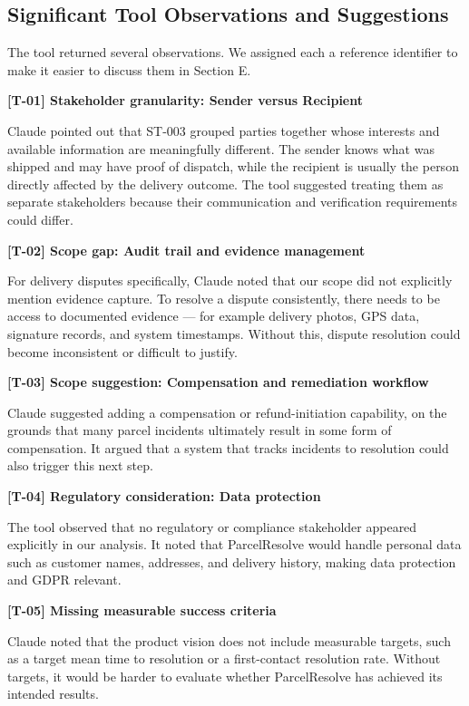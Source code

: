 \documentclass[11pt,a4paper]{article}
\begin{document}
\subsection{Significant Tool Observations and Suggestions}

The tool returned several observations. We assigned each a reference
identifier to make it easier to discuss them in Section E.

\textbf{[T-01] Stakeholder granularity: Sender versus Recipient}

Claude pointed out that ST-003 grouped parties together whose
interests and available information are meaningfully different.
The sender knows what was shipped and may have proof of dispatch,
while the recipient is usually the person directly affected by the
delivery outcome. The tool suggested treating them as separate
stakeholders because their communication and verification
requirements could differ.

\textbf{[T-02] Scope gap: Audit trail and evidence management}

For delivery disputes specifically, Claude noted that our scope did
not explicitly mention evidence capture. To resolve a dispute
consistently, there needs to be access to documented evidence ---
for example delivery photos, GPS data, signature records, and system
timestamps. Without this, dispute resolution could become
inconsistent or difficult to justify.

\textbf{[T-03] Scope suggestion: Compensation and remediation
workflow}

Claude suggested adding a compensation or refund-initiation
capability, on the grounds that many parcel incidents ultimately
result in some form of compensation. It argued that a system that
tracks incidents to resolution could also trigger this next step.

\textbf{[T-04] Regulatory consideration: Data protection}

The tool observed that no regulatory or compliance stakeholder
appeared explicitly in our analysis. It noted that ParcelResolve
would handle personal data such as customer names, addresses, and
delivery history, making data protection and GDPR relevant.

\textbf{[T-05] Missing measurable success criteria}

Claude noted that the product vision does not include measurable
targets, such as a target mean time to resolution or a first-contact
resolution rate. Without targets, it would be harder to evaluate
whether ParcelResolve has achieved its intended results.
\end{document}
